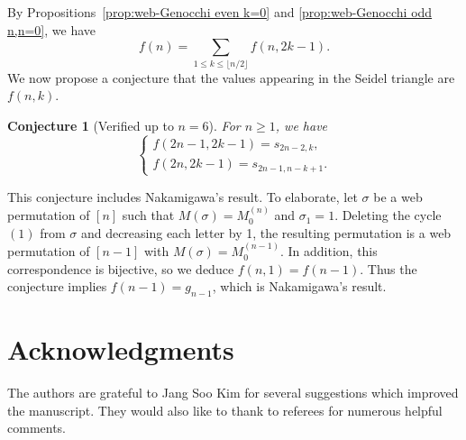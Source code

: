 \documentclass[reqno,12pt]{amsart}
\newtheorem{conj}[thm]{Conjecture}
\theoremstyle{definition}
\theoremstyle{remark}
\begin{document}
By Propositions~\ref{prop:web-Genocchi even k=0} and \ref{prop:web-Genocchi odd n,n=0}, we have
\[
  f(n)=\sum_{1\le k \le \lfloor n/2 \rfloor}f(n,2k-1).
\]
We now propose a conjecture that the values appearing in the Seidel triangle are $f(n,k)$.
\begin{conj}[Verified up to \( n=6 \)] \label{conj:Seidel}
  For \( n\ge 1 \), we have
  \[
    \begin{cases}
      f(2n-1,2k-1)= s_{2n-2, k},\\
      f(2n, 2k-1) = s_{2n-1, n-k+1}.
    \end{cases}
  \]
\end{conj}
This conjecture includes Nakamigawa's result. To elaborate, let \( \sigma \) be a
web permutation of \( [n] \) such that \( M(\sigma)=M^{(n)}_0 \) and
\( \sigma_1 = 1 \). Deleting the cycle \( (1) \) from \( \sigma \) and decreasing
each letter by 1, the resulting permutation is a web permutation of
\( [n-1] \) with \( M(\sigma)=M^{(n-1)}_0 \).
In addition, this correspondence is bijective, so we deduce \( f(n,1) = f(n-1) \).
Thus the conjecture implies \( f(n-1) = g_{n-1} \), which is Nakamigawa's result.


\section*{Acknowledgments}

The authors are grateful to Jang Soo Kim for several suggestions which
improved the manuscript.
They would also like to thank to referees for numerous helpful comments.


% 
% 
\end{document}

